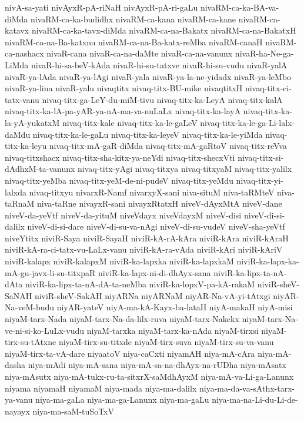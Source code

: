 {nivA-sa-yati
nivAyxR-pA-riNaH
nivAyxR-pA-ri-gaLu
nivaRM-ca-ka-BA-va-diMda
nivaRM-ca-ka-budidhx
nivaRM-ca-kana
nivaRM-ca-kane
nivaRM-ca-katavx
nivaRM-ca-ka-tavx-diMda
nivaRM-ca-na-Bakatx
nivaRM-ca-na-BakatxH
nivaRM-ca-na-Ba-katxnu
nivaRM-ca-na-Ba-katx-reMba
nivaRM-canaH
nivaRM-ca-nashacx
nivaR-cana
nivaR-ca-na-daMte
nivaR-ca-na-vanunx
nivaR-ha-Ne-ga-LiMda
nivaR-hi-sa-beV-kAda
nivaR-hi-su-tatxve
nivaR-hi-su-vudu
nivaR-yalA
nivaR-ya-lAda
nivaR-ya-lAgi
nivaR-yala
nivaR-ya-la-ne-yidadx
nivaR-ya-leMbo
nivaR-ya-lina
nivaR-yalu
nivaqtitx
nivaq-titx-BU-mike
nivaqtitxH
nivaq-titx-ci-tatx-vanu
nivaq-titx-ga-LeY-du-miM-tivu
nivaq-titx-ka-LeyA
nivaq-titx-kalA
nivaq-titx-ka-lA-pa-yAR-ya-nA-ma-va-nuLaLx
nivaq-titx-ka-layA
nivaq-titx-ka-la-yA-yukatxM
nivaq-titx-kale
nivaq-titx-ka-le-gaLeV
nivaq-titx-ka-le-ga-Li-lalx-daMdu
nivaq-titx-ka-le-gaLu
nivaq-titx-ka-leyeV
nivaq-titx-ka-le-yiMda
nivaq-titx-ka-leyu
nivaq-titx-mA-gaR-diMda
nivaq-titx-mA-gaRtoV
nivaq-titx-reVva
nivaq-titxshacx
nivaq-titx-sha-kitx-ya-neYdi
nivaq-titx-shecxVti
nivaq-titx-si-dAdhxM-ta-vanunx
nivaq-titx-yAgi
nivaq-titxya
nivaq-titxyaM
nivaq-titx-yalilx
nivaq-titx-yeMba
nivaq-titx-yeM-de-ni-pudeV
nivaq-titx-yeMdu
nivaq-titx-yi-lalxda
nivaq-titxyu
nivarxR-Namf
nivarxyX-sani
niva-situM
niva-taRMteV
niva-taRnaM
niva-taRne
nivayxR-sani
nivayxRtatxH
niveV-dAyxMtA
niveV-dane
niveV-da-yeVtf
niveV-da-yituM
niveVdayx
niveVdayxM
niveV-disi
niveV-di-si-dalilx
niveV-di-si-dare
niveV-di-su-va-nAgi
niveV-di-su-vudeV
niveV-sha-yeVtf
niveYtitx
niviR-Saya
niviR-SayaH
niviR-kA-rA-kAra
niviR-kAra
niviR-kAraH
niviR-kA-ra-ci-tatx-vu-LaLx-vanu
niviR-kA-ra-vAda
niviR-kAri
niviR-kAriV
niviR-kalapx
niviR-kalapxM
niviR-ka-lapxka
niviR-ka-lapxkaM
niviR-ka-lapx-ka-mA-gu-javx-li-su-titxpaR
niviR-ka-lapx-ni-di-dhAyx-sana
niviR-ka-lipx-ta-nA-dAta
niviR-ka-lipx-ta-nA-dA-ta-neMba
niviR-ka-lopxV-pa-kA-rakaM
niviR-sheV-SaNAH
niviR-sheV-SakAH
niyARNa
niyARNaM
niyAR-Na-vA-yi-tAtxgi
niyAR-Na-veM-budu
niyAR-yateV
niyA-ma-kA-Kayx-ba-lataH
niyA-makaH
niyA-misi
niyaM-tarx-Nada
niyaM-tarx-Na-da-lilx-ruva
niyaM-tarx-Nakekx
niyaM-tarx-Na-ve-ni-si-ko-LuLx-vudu
niyaM-tarxka
niyaM-tarx-ka-nAda
niyaM-tirxsi
niyaM-tirx-su-tAtxne
niyaM-tirx-su-titxde
niyaM-tirx-suva
niyaM-tirx-su-va-vanu
niyaM-tirx-ta-vA-dare
niyaatoV
niya-caCxti
niyamAH
niya-mA-cAra
niya-mA-dasha
niya-mAdi
niya-mA-sana
niya-mA-sa-na-dhAyx-na-rUDha
niya-mAsatx
niya-mAsutx
niya-mA-tukx-ru-ta-sitxrX-saMdhAyxM
niya-mA-va-Li-ga-Lanunx
niyama
niyamaH
niyamaM
niya-mada
niya-ma-dalilx
niya-ma-da-va-sAthx-tarx-ya-vanu
niya-ma-gaLa
niya-ma-ga-Lanunx
niya-ma-gaLu
niya-ma-na-Li-du-Li-de-nayayx
niya-ma-saM-tuSoTxV
}
